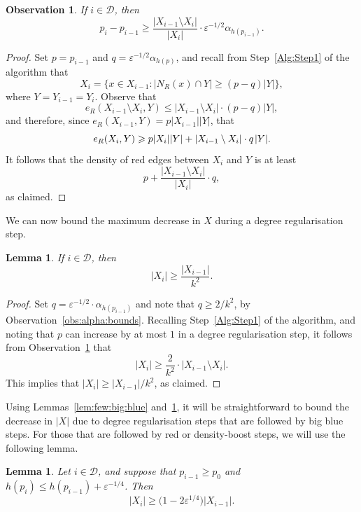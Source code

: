 \documentclass[12pt,reqno]{amsart}
\newtheorem{lemma}[theorem]{Lemma}
\newtheorem{obs}[theorem]{Observation}
\theoremstyle{definition}
\theoremstyle{remark}
\newcommand\eps{\varepsilon}
\renewcommand{\le}{\leqslant}
\renewcommand{\ge}{\geqslant}
\def\eps{\varepsilon}
\def\cD{\mathcal{D}}
\begin{document}
\begin{obs}\label{obs:degree:boost} 
If\/ $i \in \cD$, then 
$$p_i - p_{i-1} \ge \frac{|X_{i-1} \setminus X_i|}{|X_i|} \cdot \eps^{-1/2} \alpha_{h(p_{i-1})}.$$
\end{obs}

\begin{proof}
Set $p = p_{i-1}$ and $q = \eps^{-1/2} \alpha_{h(p)}$, and recall from Step~\ref{Alg:Step1} of the algorithm that 
$$X_i = \big\{ x \in X_{i-1} : |N_R(x) \cap Y| \ge (p - q) |Y| \big\},$$
where $Y = Y_{i-1} = Y_i$. Observe that 
$$e_R(X_{i-1} \setminus X_i,Y) \le |X_{i-1} \setminus X_i| \cdot (p-q) |Y| ,$$
and therefore, since $e_R(X_{i-1},Y) = p |X_{i-1}| |Y|$, that 
$$e_R(X_i,Y) \ge p |X_i||Y| + |X_{i-1} \setminus X_i| \cdot q \hspace{0.04cm} |Y|.$$
It follows that the density of red edges between $X_i$ and $Y$ is at least
$$p + \frac{|X_{i-1} \setminus X_i|}{|X_i|} \cdot q,$$ 
as claimed. 
\end{proof}

We can now bound the maximum decrease in $X$ during a degree regularisation step. 

\begin{lemma}\label{lem:degree:onestep:decrease}
If\/ $i \in \cD$, then 
$$|X_i| \ge \frac{|X_{i-1}|}{k^2}.$$
\end{lemma}

\begin{proof}
Set $q = \eps^{-1/2} \cdot \alpha_{h(p_{i-1})}$ and note that $q \ge 2/k^2$, by Observation~\ref{obs:alpha:bounds}. Recalling Step~\ref{Alg:Step1} of the algorithm, and noting that $p$ can increase by at most $1$ in a degree regularisation step, it follows from Observation~\ref{obs:degree:boost} that 
$$|X_i| \ge \frac{2}{k^2} \cdot |X_{i-1} \setminus X_i|.$$ 
This implies that $|X_i| \ge |X_{i-1}| / k^2$, as claimed.
\end{proof}

Using Lemmas~\ref{lem:few:big:blue} and~\ref{lem:degree:onestep:decrease}, it will be straightforward to bound the decrease in $|X|$ due to degree regularisation steps that are followed by big blue steps. For those that are followed by red or density-boost steps, we will use the following lemma.

\begin{lemma}\label{lem:moderate:degree:reg}
Let $i \in \cD$, and suppose that $p_{i-1} \ge p_0$ and $h(p_i) \le h(p_{i-1}) + \eps^{-1/4}$. Then
$$|X_i| \ge \big( 1 - 2 \eps^{1/4} \big) |X_{i-1}|.$$
\end{lemma}
\end{document}
